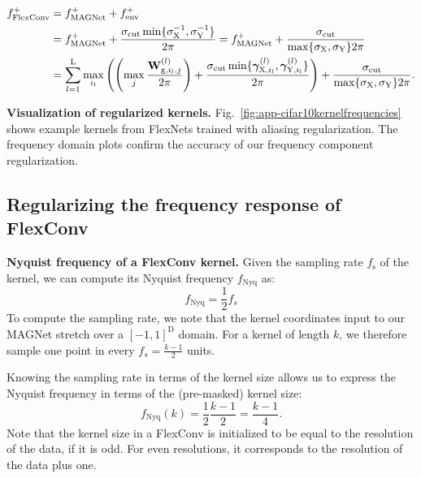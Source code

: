 \documentclass{article} \usepackage{iclr2022_conference,times}
\newcommand{\mat}[1]{\ensuremath{{\mathbf{\MakeUppercase{{#1}}}}}}
\newcommand{\Wm}{\mat{W}}
\def\Xt{\mathrm{X}}
\def\Yt{\mathrm{Y}}
\begin{document}
\begin{align}
    f^+_{\textrm{FlexConv}} &= f^+_{\textrm{MAGNet}} + f^+_{\mathrm{env}} \nonumber\\
    &= f^+_{\textrm{MAGNet}} + \frac{\sigma_{\mathrm{cut}} \min\{\sigma_{\Xt}^{-1}, \sigma_{\Yt}^{-1}\}}{2 \pi} = f^+_{\textrm{MAGNet}} + \frac{\sigma_{\mathrm{cut}}}{\max\{\sigma_\Xt, \sigma_\Yt\} 2 \pi} \nonumber\\
    &= \sum_{l=1}^{\mathrm{L}} \max_{i_l}\left( \left( \max_{j} \frac{\Wm^{(l)}_{\mathrm{g}, i_l,j}}{2 \pi} \right) + \frac{\sigma_\mathrm{cut} \min\{\boldsymbol{\gamma}^{(l)}_{\Xt, i_l}, \boldsymbol{\gamma}^{(l)}_{\Yt,i_l}\}}{2 \pi}\right) + \frac{\sigma_\mathrm{cut}}{\max\{\sigma_\Xt, \sigma_\Yt\} 2 \pi}. \label{eq:flexconvfreq}
\end{align}

\textbf{Visualization of regularized kernels.} Fig.~\ref{fig:app-cifar10kernelfrequencies} shows example kernels from FlexNets trained with aliasing regularization. The frequency domain plots confirm the accuracy of our frequency component regularization.

\subsection{Regularizing the frequency response of FlexConv}
\label{sec:magnetreg}

\textbf{Nyquist frequency of a FlexConv kernel.} Given the sampling rate $f_\mathrm{s}$ of the kernel, we can compute its Nyquist frequency $f_{\textrm{Nyq}}$ as:\begin{equation}
    f_{\textrm{Nyq}} = \frac{1}{2} f_s
\end{equation}
To compute the sampling rate, we note that the kernel coordinates input to our MAGNet stretch over a $[-1, 1]^{\mathrm{D}}$ domain. For a kernel of length $k$, we therefore sample one point in every $f_s = \frac{k-1}{2}$ units.

Knowing the sampling rate in terms of the kernel size allows us to express the Nyquist frequency in terms of the (pre-masked) kernel size:
\begin{equation}
    f_{\textrm{Nyq}}(k) = \frac{1}{2} \frac{k-1}{2} = \frac{k-1}{4}. \label{eq:flexconvnyquist}
\end{equation}
Note that the kernel size in a FlexConv is initialized to be equal to the resolution of the data, if it is odd. For even resolutions, it corresponds to the resolution of the data plus one.
\end{document}
